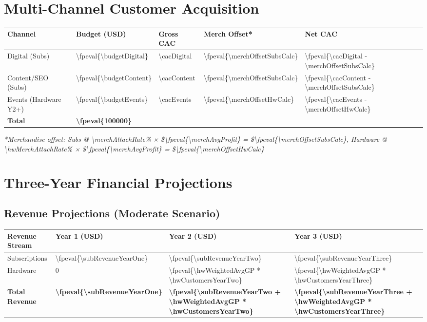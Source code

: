 \documentclass[11pt]{article}
\newcommand{\numfpeval}[1]{\num{\fpeval{#1}}}
\newcommand{\numint}[1]{\num[round-precision=0]{\fpeval{#1}}}
\begin{document}
\section{Multi-Channel Customer Acquisition}

\begin{table}[H]
\centering
\begin{tabularx}{\linewidth}{l Y Y Y Y}
\toprule
Channel & Budget (USD) & Gross CAC\cite{authoranalysis2024} & Merch Offset* & Net CAC \\\midrule
Digital (Subs) & \numint{\budgetDigital} & \num{\cacDigital} & \numfpeval{\merchOffsetSubsCalc} & \numfpeval{\cacDigital - \merchOffsetSubsCalc} \\
Content/SEO (Subs) & \numint{\budgetContent} & \num{\cacContent} & \numfpeval{\merchOffsetSubsCalc} & \numfpeval{\cacContent - \merchOffsetSubsCalc} \\
Events (Hardware Y2+) & \numint{\budgetEvents} & \num{\cacEvents} & \numfpeval{\merchOffsetHwCalc} & \numfpeval{\cacEvents - \merchOffsetHwCalc} \\\midrule
\textbf{Total} & \textbf{\numint{100000}} &  &  &  \\
\bottomrule
\end{tabularx}
\end{table}
\textit{*Merchandise offset: Subs @ \num{\merchAttachRate}\% × \$\numfpeval{\merchAvgProfit} = \$\numfpeval{\merchOffsetSubsCalc}, Hardware @ \num{\hwMerchAttachRate}\% × \$\numfpeval{\merchAvgProfit} = \$\numfpeval{\merchOffsetHwCalc}}

\section{Three-Year Financial Projections}

\subsection{Revenue Projections (Moderate Scenario)}
\begin{table}[H]
\centering
\begin{tabularx}{\linewidth}{l Y Y Y}
\toprule
Revenue Stream & Year 1 (USD) & Year 2 (USD) & Year 3 (USD) \\\midrule
Subscriptions & \numint{\subRevenueYearOne} & \numint{\subRevenueYearTwo} & \numint{\subRevenueYearThree} \\
Hardware & \num{0} & \numint{\hwWeightedAvgGP * \hwCustomersYearTwo} & \numint{\hwWeightedAvgGP * \hwCustomersYearThree} \\\midrule
\textbf{Total Revenue} & \textbf{\numint{\subRevenueYearOne}} & \textbf{\numint{\subRevenueYearTwo + \hwWeightedAvgGP * \hwCustomersYearTwo}} & \textbf{\numint{\subRevenueYearThree + \hwWeightedAvgGP * \hwCustomersYearThree}} \\
\bottomrule
\end{tabularx}
\end{table}
\end{document}
